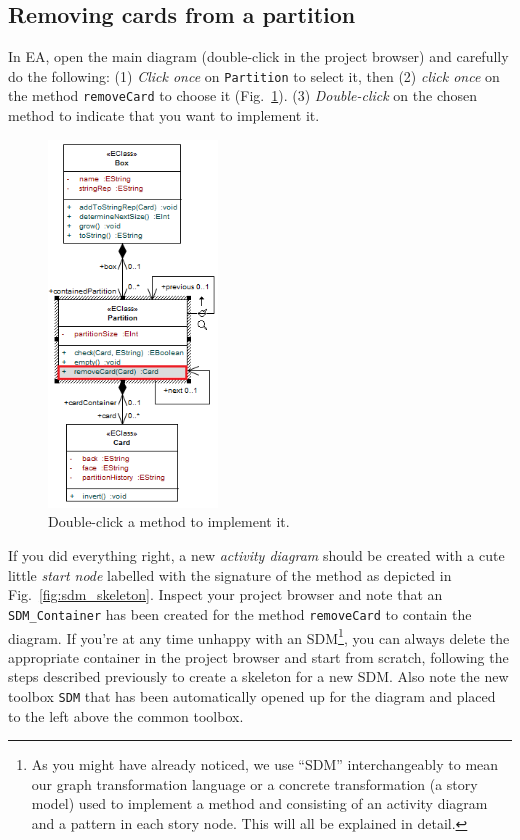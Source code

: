 \subsection{Removing cards from a partition}

In EA, open the main diagram (double-click in the project browser) and carefully do the following: (1) \emph{Click once} on \texttt{Partition} to select it, then (2) \emph{click once} on the method \texttt{removeCard} to choose it (Fig.~\ref{fig:sdm_start}). 
(3) \emph{Double-click} on the chosen method to indicate that you want to implement it.

\begin{figure}[htp]
\begin{center}
  \includegraphics[width=0.4\textwidth]{pics/sdmBilder/removeCard/sdm01RAW}
  \caption{Double-click a method to implement it.}  
  \label{fig:sdm_start}
\end{center}
\end{figure}
 
If you did everything right, a new \emph{activity diagram} should be created  with a cute little \emph{start node} labelled with the signature of the method  as depicted in Fig.~\ref{fig:sdm_skeleton}.  Inspect your project browser and note that an \texttt{SDM\_Container} has been created for the method \texttt{removeCard} to contain the diagram.  
If you're at any time unhappy with an SDM\footnote{As you might have already noticed, we use ``SDM'' interchangeably to mean our graph transformation language or a concrete transformation (a story model) used to implement a method and consisting of an activity diagram and a pattern in each story node.  
This will all be explained in detail.}, you can always delete the appropriate container in the project browser and start from scratch, following the steps described previously to create a skeleton for a new SDM.  
Also note the new  toolbox \texttt{SDM} that has been automatically opened up for the diagram and placed to the left above the common toolbox. 

